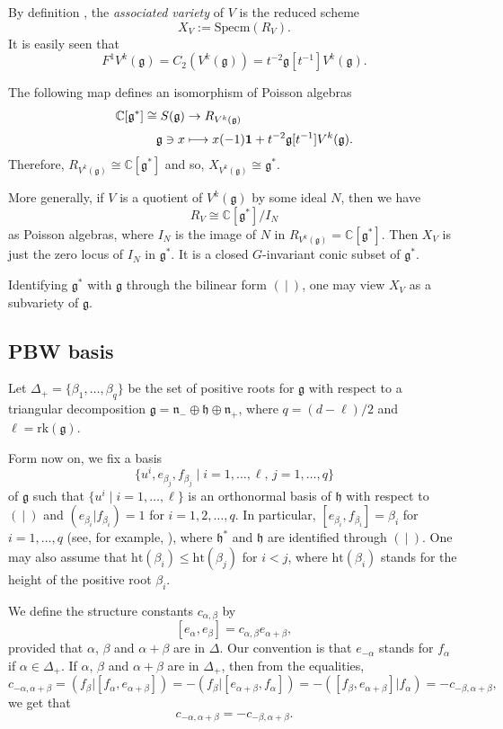\documentclass[11pt]{article}
\numberwithin{equation}{section}
\newcommand\mto{\mathchoice{\longmapsto}{\mapsto}{\mapsto}{\mapsto}}
\let\al\alpha
\let\be\beta
\newcommand\C{{\mathbb C}}
\newcommand \g{\mathfrak g}
\newcommand \h{\mathfrak{h}}
\theoremstyle{definition}
\begin{document}
By definition \cite{Ara12}, the
\emph{associated variety} of $V$
is
the reduced scheme
\[
X_V:= \mathrm{Specm}(R_V).
\]
It is easily seen that
\[
F^1 V^k(\g) = C_2(V^k(\g)) = t^{-2} \g[t^{-1}] V^k(\g).
\]

The following map defines an isomorphism of Poisson algebras
\begin{align*}
\C[\g^*] \cong S(\g) & \to R_{V^k(\g)} \\[0.2em]
\g \ni x & \mto x (-1) \mathbf{1}
+ t^{-2} \g[t^{-1}] V^k(\g).
\end{align*}
Therefore, $R_{V^k(\g)} \cong \C[\g^*]$ and so, $
X_{V^k(\g)}\cong \g^*$.

More generally, if $V$ is a quotient of $V^k(\g)$
by some ideal $N$, then
we have
\begin{equation}
R_{V}\cong \C[\g^*]/I_N
\end{equation}
as Poisson algebras,
where $I_N$ is the image of $N$ in $R_{V^k(\g)}=\C[\g^*]$.
Then $X_V$ is just the zero locus of $I_N$ in
$\g^*$.
It is a closed $G$-invariant conic subset of $\g^*$.

Identifying $\g^*$ with $\g$ through the bilinear form $(~|~)$,
one may view $X_V$ as a subvariety of $\g$.

\subsection{PBW basis}
Let ${\Delta}_{+}=\{\be_1,\dots,\be_q\}$ be the set of positive roots for $\g$ with respect
to a triangular decomposition
$\g= \mathfrak{n}_- \oplus \mathfrak{h} \oplus \mathfrak{n}_+$,
where $q=(d-\ell)/2$ and $\ell=\mathrm{rk}(\g)$.

Form now on, we
fix a basis
\[
\{u^i, e_{\be_j}, f_{\be_j}\mid i=1,\dots,\ell, \, j=1,\dots, q\}
\]
of $\g$ such that $\{u^{i} \mid i=1,\dots,\ell\}$
is an orthonormal basis of $\h$ with respect to $(~|~)$ and
$(e_{\be_i}|f_{\be_i})=1$ for $i=1,2,\dots,q$.
In particular, $[e_{\be_i}, f_{\be_i}]= \be_i$
for $i=1,\dots,q$ (see, for example, \cite[Prop.\,8.3]{Hu72}),
where $\h^*$ and $\h$ are identified through $(~|~)$.
One may also assume that $\mathrm{ht}(\be_i)\leq \mathrm{ht}(\be_j)$ for $i< j$,
where $\mathrm{ht}(\be_i)$ stands for the height of the positive root $\be_i$.

We define the structure constants $c_{\al,\be}$ by
\[
[e_\al,e_{\be}] = c_{\al,\be} e_{\al+\be},
\]
provided that $\al$, $\be$ and $\al+\be$ are in $\Delta$.
Our convention is that $e_{-\al}$ stands for $f_\al$ if $\alpha \in \Delta_+$.
If $\al$, $\be$ and $\al+\be$ are in $\Delta_+$,
then from the equalities,
\begin{equation*}
c_{-\al,\al+\be} = (f_{\be} | [f_{\al},e_{\al+\be}]) = - (f_{\be} | [e_{\al+\be},f_{\al}])
= - ([f_{\be}, e_{\al+\be}]|f_{\al}) = - c_{-\be,\al+\be},
\end{equation*}
we get that
\begin{equation}
\label{eq:structure_constant}
c_{-\al,\al+\be}= - c_{-\be,\al+\be}.
\end{equation}
\end{document}
